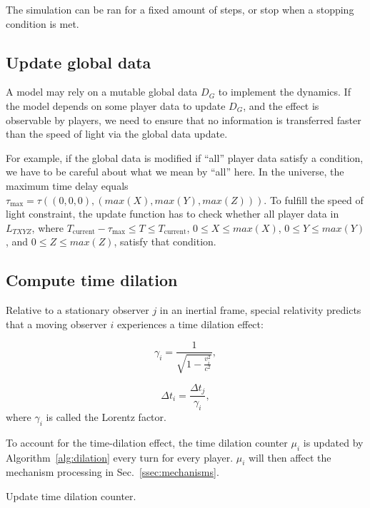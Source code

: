 \documentclass{svproc}
\begin{document}
The simulation can be ran for a fixed amount of steps, or stop when a stopping condition is met.

\subsection{Update global data} \label{ssec:global}

A model may rely on a mutable global data $D_G$ to implement the dynamics.
If the model depends on some player data to update $D_G$, 
and the effect is observable by players,
we need to ensure that no information is transferred faster than the speed of light via
the global data update.

For example, if the global data is modified if ``all'' player data satisfy a condition,
we have to be careful about what we mean by ``all'' here.
In the universe, the maximum time delay equals $\tau_{\textrm{max}} = \tau((0, 0, 0), (max(X), max(Y), max(Z)))$.
To fulfill the speed of light constraint, the update function has to check whether all player data in
$L_{TXYZ}$, where $T_{\textrm{current}} - \tau_{\textrm{max}} \leq T \leq T_{\textrm{current}}$,
$0 \leq X \leq max(X)$, $0 \leq Y \leq max(Y)$, and $0 \leq Z \leq max(Z)$,
satisfy that condition.

\subsection{Compute time dilation} \label{ssec:dilation}

Relative to a stationary observer $j$ in an inertial frame,
special relativity predicts that a moving observer $i$ experiences a time dilation effect:

\begin{equation} \label{eq:gamma}
  \gamma_i = \frac{1}{\sqrt{1 - \frac{v_i^2}{c^2}}},
\end{equation}

\begin{equation}
  \Delta t_i = \frac{\Delta t_j}{\gamma_i},
\end{equation}
where $\gamma_i$ is called the Lorentz factor.

To account for the time-dilation effect, 
the time dilation counter $\mu_i$ is updated by Algorithm~\ref{alg:dilation}
every turn for every player. 
$\mu_{i}$ will then affect the mechanism processing in Sec.~\ref{ssec:mechanisms}.

\begin{algorithm}


\caption{Update time dilation counter.}
\label{alg:dilation}
\end{algorithm}
\end{document}
